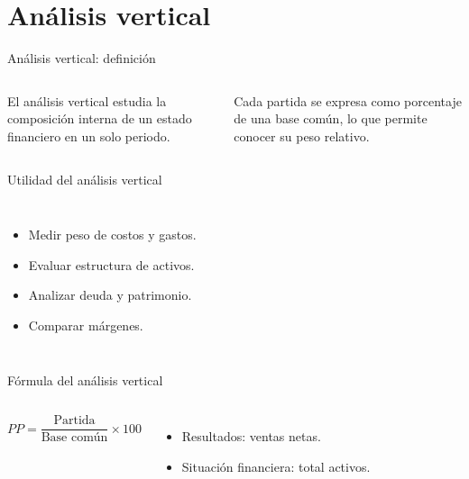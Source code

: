\section{Análisis vertical}

\begin{frame}{Análisis vertical: definición}
  \begin{columns}[T,onlytextwidth]
    \footnotesize
    El análisis vertical estudia la composición interna de un estado financiero en un solo periodo.

    \vspace{0.5em}
    Cada partida se expresa como porcentaje de una base común, lo que permite conocer su peso relativo.
  \end{columns}
\end{frame}

\begin{frame}{Utilidad del análisis vertical}
  \begin{columns}[T,onlytextwidth]
    \begin{itemize}
      \item Medir peso de costos y gastos.
      \item Evaluar estructura de activos.
      \item Analizar deuda y patrimonio.
      \item Comparar márgenes.
    \end{itemize}
  \end{columns}
\end{frame}

\begin{frame}{Fórmula del análisis vertical}
  \begin{columns}[T,onlytextwidth]
    \[
      PP=\frac{\text{Partida}}{\text{Base común}}\times 100
    \]
    \begin{itemize}
      \item Resultados: ventas netas.
      \item Situación financiera: total activos.
    \end{itemize}
  \end{columns}
\end{frame}

